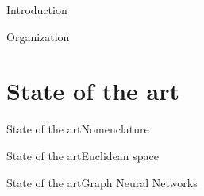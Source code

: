 \documentclass[xcolor=table]{beamer}
\begin{document}
\begin{frame}{Introduction}
    \begin{block}{Organization}
    {
    }
    \end{block}
    
\end{frame}



\section{State of the art}
\begin{frame}{State of the art}{Nomenclature}

\end{frame}



\begin{frame}{State of the art}{Euclidean space}


\end{frame}




\begin{frame}{State of the art}{Graph Neural Networks}



\end{frame}
\end{document}
